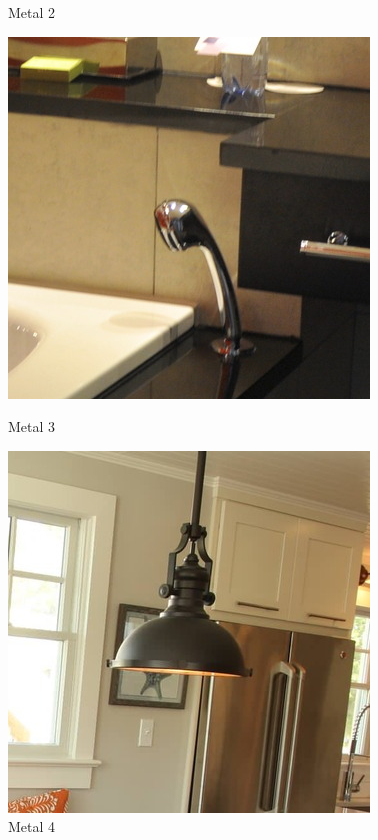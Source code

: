 \documentclass[conference, compsoc, 12pt]{IEEEtran}
\begin{document}
\begin{figure}[ht]
\begin{minipage}[b]{0.5\linewidth}
    \caption{Metal 2}
    \vspace{4ex}
  \end{minipage}
  \begin{minipage}[b]{0.5\linewidth}
    \centering
    \includegraphics[width=.8\linewidth]{metal_000015.jpg}
    \caption{Metal 3}
    \vspace{4ex}
  \end{minipage}%
  \begin{minipage}[b]{0.5\linewidth}
    \centering
    \includegraphics[width=.8\linewidth]{metal_000025.jpg}
    \caption{Metal 4}
    \vspace{4ex}
  \end{minipage}
\end{figure}
\end{document}
